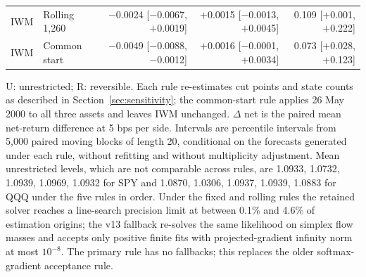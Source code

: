 \begin{table}[!htbp]
\begin{tabular}{llrrr}
IWM & Rolling 1,260 & $-$0.0024 [$-$0.0067, $+$0.0019] & $+$0.0015 [$-$0.0013, $+$0.0045] & 0.109 [$+$0.001, $+$0.222]\\
IWM & Common start & $-$0.0049 [$-$0.0088, $-$0.0012] & $+$0.0016 [$-$0.0001, $+$0.0034] & 0.073 [$+$0.028, $+$0.123]\\
\bottomrule\end{tabular}
\par\smallskip\parbox{0.98\linewidth}{\footnotesize U: unrestricted; R: reversible. Each rule re-estimates cut points and state counts as described in Section~\ref{sec:sensitivity}; the common-start rule applies 26 May 2000 to all three assets and leaves IWM unchanged. $\Delta$ net is the paired mean net-return difference at 5 bps per side. Intervals are percentile intervals from 5,000 paired moving blocks of length 20, conditional on the forecasts generated under each rule, without refitting and without multiplicity adjustment. Mean unrestricted levels, which are not comparable across rules, are 1.0933, 1.0732, 1.0939, 1.0969, 1.0932 for SPY and 1.0870, 1.0306, 1.0937, 1.0939, 1.0883 for QQQ under the five rules in order. Under the fixed and rolling rules the retained solver reaches a line-search precision limit at between 0.1\% and 4.6\% of estimation origins; the v13 fallback re-solves the same likelihood on simplex flow masses and accepts only positive finite fits with projected-gradient infinity norm at most $10^{-8}$. The primary rule has no fallbacks; this replaces the older softmax-gradient acceptance rule.}
\end{table}
